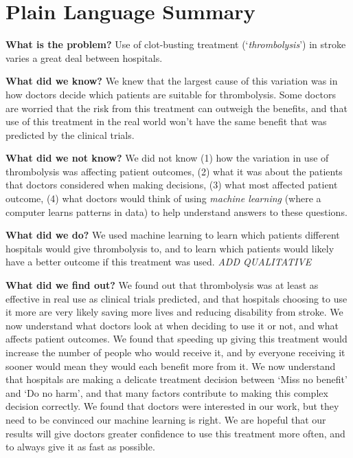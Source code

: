 \section*{Plain Language Summary}

\textbf{What is the problem?} Use of clot-busting treatment (`\textit{thrombolysis}') in stroke varies a great deal between hospitals.

\textbf{What did we know?} We knew that the largest cause of this variation was in how doctors decide which patients are suitable for thrombolysis. Some doctors are worried that the risk from this treatment can outweigh the benefits, and that use of this treatment in the real world won’t have the same benefit that was predicted by the clinical trials.

\textbf{What did we not know?} We did not know (1) how the variation in use of thrombolysis was affecting patient outcomes, (2) what it was about the patients that doctors considered when making decisions, (3) what most affected patient outcome, (4) what doctors would think of using \textit{machine learning} (where a computer learns patterns in data) to help understand answers to these questions.

\textbf{What did we do?} We used machine learning to learn which patients different hospitals would give thrombolysis to, and to learn which patients would likely have a better outcome if this treatment was used. \textit{ADD QUALITATIVE}

\textbf{What did we find out?} We found out that thrombolysis was at least as effective in real use as clinical trials predicted, and that hospitals choosing to use it more are very likely saving more lives and reducing disability from stroke. We now understand what doctors look at when deciding to use it or not, and what affects patient outcomes. We found that speeding up giving this treatment would increase the number of people who would receive it, and by everyone receiving it sooner would mean they would each benefit more from it. We now understand that hospitals are making a delicate treatment decision between ‘Miss no benefit’ and ‘Do no harm’, and that many factors contribute to making this complex decision correctly. We found that doctors were interested in our work, but they need to be convinced our machine learning is right. We are hopeful that our results will give doctors greater confidence to use this treatment more often, and to always give it as fast as possible.